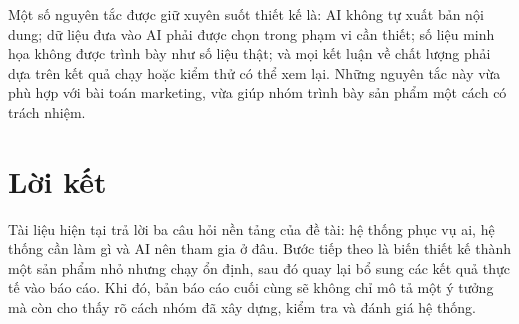Một số nguyên tắc được giữ xuyên suốt thiết kế là: AI không tự xuất bản nội dung; dữ liệu đưa vào AI phải được chọn trong phạm vi cần thiết; số liệu minh họa không được trình bày như số liệu thật; và mọi kết luận về chất lượng phải dựa trên kết quả chạy hoặc kiểm thử có thể xem lại. Những nguyên tắc này vừa phù hợp với bài toán marketing, vừa giúp nhóm trình bày sản phẩm một cách có trách nhiệm.

\section{Lời kết}

Tài liệu hiện tại trả lời ba câu hỏi nền tảng của đề tài: hệ thống phục vụ ai, hệ thống cần làm gì và AI nên tham gia ở đâu. Bước tiếp theo là biến thiết kế thành một sản phẩm nhỏ nhưng chạy ổn định, sau đó quay lại bổ sung các kết quả thực tế vào báo cáo. Khi đó, bản báo cáo cuối cùng sẽ không chỉ mô tả một ý tưởng mà còn cho thấy rõ cách nhóm đã xây dựng, kiểm tra và đánh giá hệ thống.
